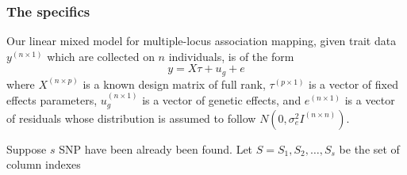 \documentclass[12pt]{article}
\begin{document}
 
 
 

\subsubsection{The specifics}

Our linear mixed model for multiple-locus association mapping, given trait data $y^{(n \times 1)}$ which are collected on $n$ individuals, 
is of the form 
\begin{equation}
y = X \tau + u_g + e
\end{equation}
where $X^{(n \times p)}$ is a known design matrix of full rank, $\tau^{(p \times 1)}$ is a vector of fixed effects parameters, $u_g^{(n \times 1)}$ is a vector 
of genetic effects, and $e^{(n \times 1)}$ is a vector of residuals whose distribution is assumed to follow $N(0, \sigma^2_e I^{(n \times n)})$. 

Suppose $s$ SNP have been already been found. Let $S={ S_1, S_2, \ldots, S_s}$ be the set of column indexes 






\end{document}
